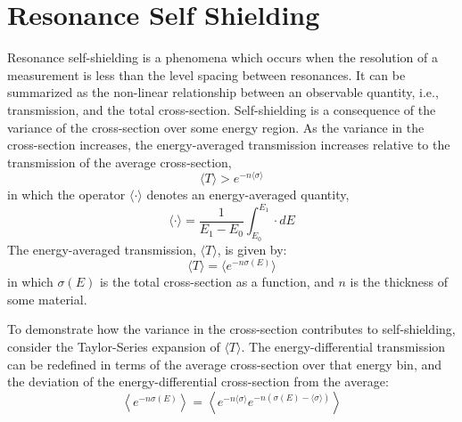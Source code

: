 \section{Resonance Self Shielding}
\label{sec:resonance-self-shielding}
Resonance self-shielding is a phenomena which occurs when the resolution of a measurement is less than the level spacing between resonances. It can be summarized as the non-linear relationship between an observable quantity, i.e., transmission, and the total cross-section. Self-shielding is a consequence of the variance of the cross-section over some energy region. As the variance in the cross-section increases, the energy-averaged transmission increases relative to the transmission of the average cross-section,
\begin{equation}
    \label{eq:self-shielding-definition}
    \langle T \rangle > e^{-n \langle \sigma \rangle}
\end{equation}
in which the operator $\langle \cdot \rangle$ denotes an energy-averaged quantity,
\begin{equation}
    \label{eq:energy-average-operator}
    \langle \cdot \rangle = \frac{1}{E_{1} - E_{0}} \int_{E_{0}}^{E_{1}} \cdot dE
\end{equation}
The energy-averaged transmission, $\langle T \rangle$, is given by:
\begin{equation}
    \label{eq:energy-average-Transmission}
    \langle T \rangle = \langle e^{-n \sigma(E)} \rangle
\end{equation}
in which $\sigma(E)$ is the total cross-section as a function, and $n$ is the thickness of some material.

To demonstrate how the variance in the cross-section contributes to self-shielding, consider the Taylor-Series expansion of $\langle T \rangle$. The energy-differential transmission can be redefined in terms of the average cross-section over that energy bin, and the deviation of the energy-differential cross-section from the average:
\begin{equation}
    \left\langle e^{-n \sigma(E)} \right\rangle = \left\langle e^{-n \langle \sigma \rangle} e^{-n \left(\sigma(E) - \langle \sigma \rangle \right)} \right\rangle
\end{equation}


